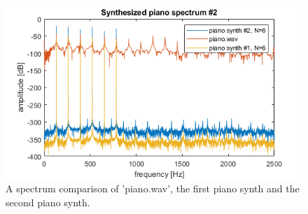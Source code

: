 \documentclass[journal]{IEEEtran}
\begin{document}
\begin{figure} [H]
    \centering
    \includegraphics[width=\linewidth]{assignment_01/plots/synth2.png}
    \caption{A spectrum comparison of 'piano.wav', the first piano synth and the second piano synth.}
    \label{fig:synth2}
\end{figure}

\end{document}
